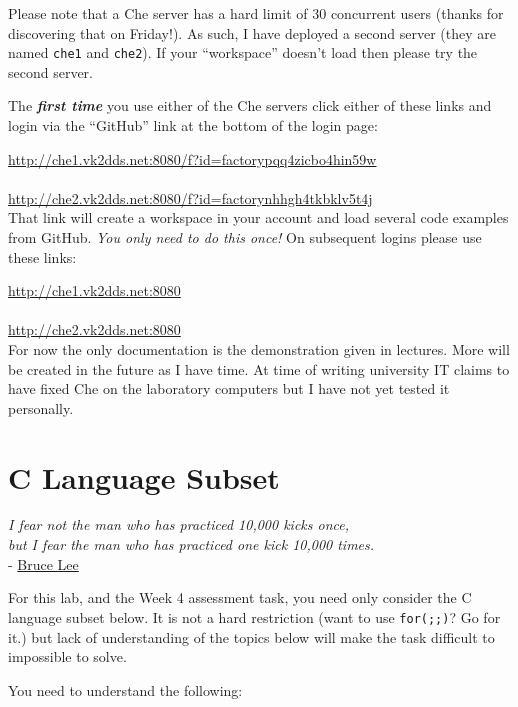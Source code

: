 \documentclass{lab}
\begin{document}
Please note that a Che server has a hard limit of 30 concurrent users (thanks for discovering that on Friday!). As such, I have deployed a second server (they are named \texttt{che1} and \texttt{che2}). If your ``workspace'' doesn't load then please try the second server.

The \textit{\textbf{first time}} you use either of the Che servers click either of these links and login via the ``GitHub'' link at the bottom of the login page:

\url{http://che1.vk2dds.net:8080/f?id=factorypqq4zicbo4hin59w} \\
\\
\url{http://che2.vk2dds.net:8080/f?id=factorynhhgh4tkbklv5t4j} \\

That link will create a workspace in your account and load several code examples from GitHub. \textit{You only need to do this once!} On subsequent logins please use these links:

\url{http://che1.vk2dds.net:8080} \\ \\
\url{http://che2.vk2dds.net:8080} \\

For now the only documentation is the demonstration given in lectures. More will be created in the future as I have time. At time of writing university IT claims to have fixed Che on the laboratory computers but I have not yet tested it personally.

\pagebreak
\section{C Language Subset}

\begin{center}
\textit{I fear not the man who has practiced 10,000 kicks once,\\but I fear the man who has practiced one kick 10,000 times.}\\- \href{https://www.youtube.com/watch?v=bmfudW7rbG0}{Bruce Lee}
\end{center}

For this lab, and the Week 4 assessment task, you need only consider the C language subset below. It is not a hard restriction (want to use \texttt{for(;;)}? Go for it.) but lack of understanding of the topics below will make the task difficult to impossible to solve.

You need to understand the following:
\end{document}
